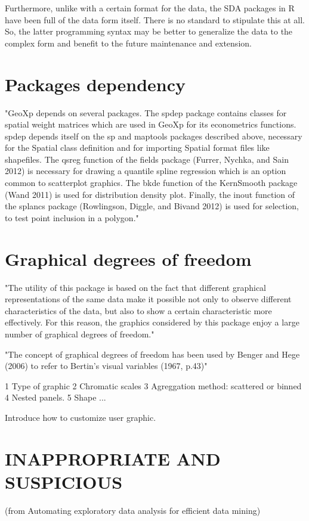 \documentclass[article]{jss}
\begin{document}
Furthermore, unlike  with a certain format for the data, the SDA packages in R have been full of the data form itself. There is no standard to stipulate this at all. So, the latter programming syntax may be better to generalize the data to the complex form and benefit to the future maintenance and extension.


\section*{Packages dependency}
"GeoXp depends on several packages. The spdep package contains classes for spatial weight
matrices which are used in GeoXp for its econometrics functions. spdep depends itself on
the sp and maptools packages described above, necessary for the Spatial class definition and
for importing Spatial format files like shapefiles. The qsreg function of the fields package
(Furrer, Nychka, and Sain 2012) is necessary for drawing a quantile spline regression which
is an option common to scatterplot graphics. The bkde function of the KernSmooth package
(Wand 2011) is used for distribution density plot. Finally, the inout function of the splancs
package (Rowlingson, Diggle, and Bivand 2012) is used for selection, to test point inclusion
in a polygon."




\section*{Graphical degrees of freedom}

"The utility of this package is based on the fact that different graphical representations of the
same data make it possible not only to observe different characteristics of the data, but also
to show a certain characteristic more effectively. For this reason, the graphics considered by
this package enjoy a large number of graphical degrees of freedom."

"The concept of graphical degrees of freedom has been used by Benger and Hege (2006) to refer to Bertin's visual variables (1967, p.43)"


1 Type of graphic
2 Chromatic scales
3 Agreggation method: scattered or binned
4 Nested panels.
5 Shape
...

Introduce how to customize user graphic.


\section*{INAPPROPRIATE AND SUSPICIOUS}
(from Automating exploratory data analysis for efficient data mining)
\end{document}
